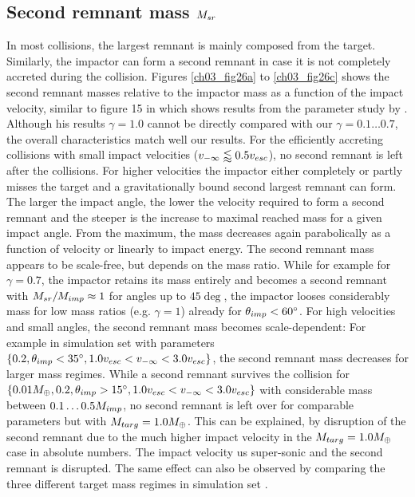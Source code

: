 \subsection{Second remnant mass $M_{sr}$}
In most collisions, the largest remnant is mainly composed from the target. Similarly, the impactor can form a second remnant in case it is not completely accreted during the collision. Figures \ref{ch03_fig26a} to \ref{ch03_fig26c} shows the second remnant masses relative to the impactor mass as a function of the impact velocity, similar to figure 15 in \cite{Asphaug:2010p3539} which shows results from the parameter study by \cite{Agnor:2004p3329}. Although his results $\gamma = 1.0$ cannot be directly compared with our $\gamma = 0.1 \dots 0.7$, the overall characteristics match well our results. For the efficiently accreting collisions with small impact velocities ($v_{-\infty} \lessapprox 0.5 v_{esc}$), no second remnant is left after the collisions. For higher velocities the impactor either completely or partly misses the target and a gravitationally bound second largest remnant can form. The larger the impact angle, the lower the velocity required to form a second remnant and the steeper is the increase to maximal reached mass for a given impact angle. From the maximum, the mass decreases again parabolically as a function of velocity or linearly to impact energy. The second remnant mass appears to be scale-free, but depends on the mass ratio. While for example for $\gamma = 0.7$, the impactor retains its mass entirely and becomes a second remnant with $M_{sr} / M_{imp} \approx 1$ for angles up to $45 \deg$, the impactor looses considerably mass for low mass ratios (e.g. $\gamma = 1$) already for $\theta_{imp} < 60 ^\circ$. For high velocities and small angles, the second remnant mass becomes scale-dependent: For example in simulation set \css with parameters $\{0.2, \theta_{imp} < 35 ^\circ, 1.0 v_{esc} < v_{-\infty} < 3.0 v_{esc} \}$, the second remnant mass decreases for larger mass regimes. While a  second remnant survives the collision for $\{0.01 M_{\oplus}, 0.2, \theta_{imp} > 15 ^\circ, 1.0 v_{esc} < v_{-\infty} < 3.0 v_{esc} \}$ with considerable mass between $0.1 \dots 0.5 M_{imp}$, no second remnant is left over for comparable parameters but with $M_{targ} = 1.0 M_{\oplus}$. This can be explained, by disruption of the second remnant due to the much higher impact velocity in the $M_{targ} = 1.0 M_{\oplus}$ case in absolute numbers. The impact velocity us super-sonic and the second remnant is disrupted. The same effect can also be observed by comparing the three different target mass regimes in simulation set \iss.

